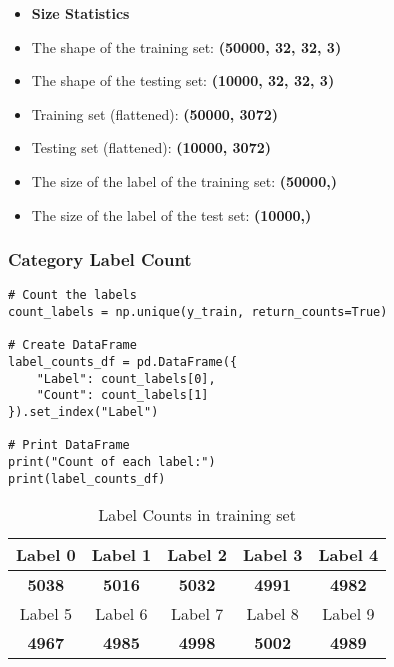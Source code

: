 \documentclass[a4paper,11pt]{article}
\begin{document}
\begin{itemize}
    \item \textbf{Size Statistics}
    \item The shape of the training set: \textbf{(50000, 32, 32, 3)}
    \item The shape of the testing set: \textbf{(10000, 32, 32, 3)}
    \item Training set (flattened): \textbf{(50000, 3072)}
    \item Testing set (flattened): \textbf{(10000, 3072)}
    \item The size of the label of the training set:  \textbf{(50000,)}
    \item The size of the label of the test set: \textbf{(10000,)}
\end{itemize}

\subsubsection{Category Label Count}

\begin{listing}[!ht]
\begin{verbatim}
# Count the labels
count_labels = np.unique(y_train, return_counts=True)

# Create DataFrame
label_counts_df = pd.DataFrame({
    "Label": count_labels[0],
    "Count": count_labels[1]
}).set_index("Label")

# Print DataFrame
print("Count of each label:")
print(label_counts_df)
\end{verbatim}
\label{listing:python}
\end{listing}

\begin{table}[h]
    \centering
    \begin{tabular}{|c|c|c|c|c|}
        \hline
        Label 0 & Label 1 & Label 2 & Label 3 & Label 4 \\
        \hline
        \textbf{5038} & \textbf{5016} & \textbf{5032} & \textbf{4991} & \textbf{4982} \\
        \hline
        Label 5 & Label 6 & Label 7 & Label 8 & Label 9 \\
        \hline
        \textbf{4967} & \textbf{4985} & \textbf{4998} & \textbf{5002} & \textbf{4989} \\
        \hline
    \end{tabular}
    \caption{Label Counts in training set}
    \label{tab:example}
\end{table}
\end{document}

